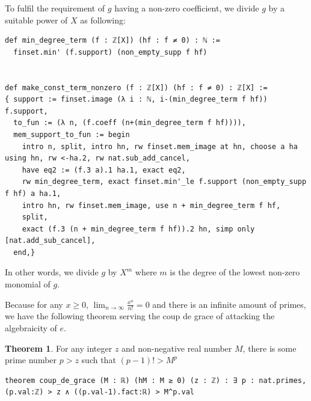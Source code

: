 \documentclass{report}
\theoremstyle{definition}
\newtheorem{theorem}{Theorem}[section]
\newenvironment{code}{\captionsetup{type=listing}}{}
\begin{document}
To fulfil the requirement of $g$ having a non-zero coefficient, we divide $g$ by a suitable power of $X$ as following:
\begin{code}
\begin{verbatim}
def min_degree_term (f : ℤ[X]) (hf : f ≠ 0) : ℕ := 
  finset.min' (f.support) (non_empty_supp f hf)


def make_const_term_nonzero (f : ℤ[X]) (hf : f ≠ 0) : ℤ[X] := 
{ support := finset.image (λ i : ℕ, i-(min_degree_term f hf)) f.support,
  to_fun := (λ n, (f.coeff (n+(min_degree_term f hf)))),
  mem_support_to_fun := begin
    intro n, split, intro hn, rw finset.mem_image at hn, choose a ha using hn, rw <-ha.2, rw nat.sub_add_cancel,
    have eq2 := (f.3 a).1 ha.1, exact eq2,
    rw min_degree_term, exact finset.min'_le f.support (non_empty_supp f hf) a ha.1,
    intro hn, rw finset.mem_image, use n + min_degree_term f hf,
    split,
    exact (f.3 (n + min_degree_term f hf)).2 hn, simp only [nat.add_sub_cancel],
  end,}
\end{verbatim}

In other words, we divide $g$ by $X^m$ where $m$ is the degree of the lowest non-zero monomial of $g$.
\end{code}

Because for any $x\ge 0$, $\lim_{n\to\infty}\frac{x^n}{n!}=0$ and there is an infinite amount of primes, we have the following theorem serving the coup de grace of attacking the algebraicity of $e$.
\begin{theorem}
For any integer $z$ and non-negative real number $M$, there is some prime number $p>z$ such that $(p-1)!>M^p$
\begin{verbatim}
theorem coup_de_grace (M : ℝ) (hM : M ≥ 0) (z : ℤ) : ∃ p : nat.primes, (p.val:ℤ) > z ∧ ((p.val-1).fact:ℝ) > M^p.val
\end{verbatim} 
\end{theorem}
\end{document}
